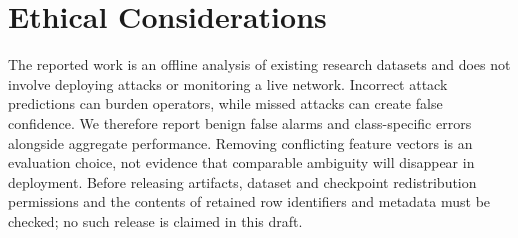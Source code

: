 \documentclass[sigconf,anonymous,pbalance]{acmart}
\begin{document}
\section{Ethical Considerations}
The reported work is an offline analysis of existing research datasets and does not involve deploying attacks or monitoring a live network. Incorrect attack predictions can burden operators, while missed attacks can create false confidence. We therefore report benign false alarms and class-specific errors alongside aggregate performance. Removing conflicting feature vectors is an evaluation choice, not evidence that comparable ambiguity will disappear in deployment. Before releasing artifacts, dataset and checkpoint redistribution permissions and the contents of retained row identifiers and metadata must be checked; no such release is claimed in this draft.
\end{document}
